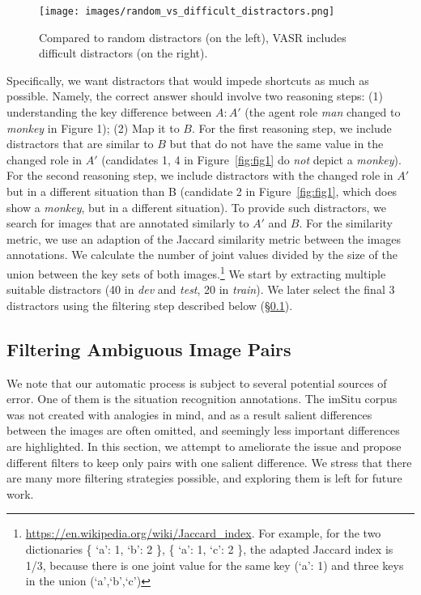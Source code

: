 \documentclass[letterpaper]{article} \usepackage{aaai23}  \usepackage{times}  \usepackage{helvet}  \usepackage{courier}  \usepackage[hyphens]{url}  \usepackage{graphicx} \urlstyle{rm} \def\UrlFont{\rm}  \usepackage{natbib}  \usepackage{caption} \frenchspacing  \setlength{\pdfpagewidth}{8.5in}  \setlength{\pdfpageheight}{11in}  \usepackage{algorithm}
\begin{document}
\begin{figure}[!t]
\centering
\newcommand{\figlen}[0]{\columnwidth}
    \texttt{[image: images/random\_vs\_difficult\_distractors.png]}\\
    \caption{Compared to random distractors (on the left), VASR includes difficult distractors (on the right).}
    \label{fig:random_vs_difficult_distractors}
\end{figure}

Specifically, we want distractors that would impede shortcuts as much as possible. Namely, the correct answer should involve two reasoning steps: (1) understanding the
key difference between $A:A'$ (the agent role \textit{man} changed to \textit{monkey} in Figure 1); (2) Map it to $B$. For the first reasoning step, we include distractors that are similar to $B$ but that do not have the same value in the changed role in $A'$ (candidates 1, 4 in Figure~\ref{fig:fig1} do \emph{not} depict a \emph{monkey}). For the second reasoning step, we include distractors with the changed role in $A'$ but in a different situation than B (candidate 2 in Figure~\ref{fig:fig1}, which does show a \emph{monkey}, but in a different situation). To provide such distractors, we search for images that are annotated similarly to $A'$ and $B$. For the similarity metric, we use an adaption of the Jaccard similarity metric between the images annotations. We calculate the number of joint values divided by the size of the union between the key sets of both images.\footnote{\url{https://en.wikipedia.org/wiki/Jaccard_index}. For example, for the two dictionaries \{ `a': 1, `b': 2 \}, \{ `a': 1, `c': 2 \}, the adapted Jaccard index is 1/3, because there is one joint value for the same key (`a': 1) and three keys in the union (`a',`b',`c')} We start by extracting multiple suitable distractors (40 in \emph{dev} and \emph{test}, 20 in \emph{train}). We later select the final 3 distractors using the filtering step described below (\S\ref{sec:filtering}).

\subsection{Filtering Ambiguous Image Pairs}
\label{sec:filtering}
We note that our automatic process is subject to several potential sources of error. One of them is the situation recognition annotations. The imSitu corpus was not created with analogies in mind, and as a result salient differences between the images are often omitted, and seemingly less important differences are highlighted. In this section, we attempt to ameliorate the issue and propose different filters to keep only pairs with one salient difference. We stress that there are many more filtering strategies possible, and exploring them is left for future work.
\end{document}
